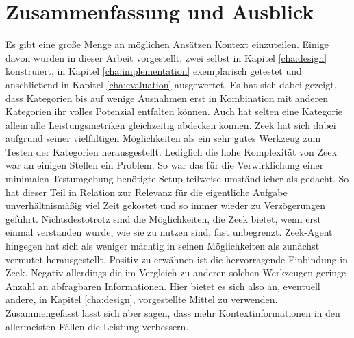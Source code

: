 \chapter{Zusammenfassung und Ausblick}%
\label{cha:conclusion}


Es gibt eine große Menge an möglichen Ansätzen Kontext einzuteilen. Einige davon wurden in dieser Arbeit vorgestellt, zwei selbst in Kapitel \ref{cha:design} konstruiert, in Kapitel \ref{cha:implementation} exemplarisch getestet und anschließend in Kapitel \ref{cha:evaluation} ausgewertet. Es hat sich dabei gezeigt, dass Kategorien bis auf wenige Ausnahmen erst in Kombination mit anderen Kategorien ihr volles Potenzial entfalten können. Auch hat selten eine Kategorie allein alle Leistungsmetriken gleichzeitig abdecken können. Zeek hat sich dabei aufgrund seiner vielfältigen Möglichkeiten als ein sehr gutes Werkzeug zum Testen der Kategorien herausgestellt. Lediglich die hohe Komplexität von Zeek war an einigen Stellen ein Problem. So war das für die Verwirklichung einer minimalen Testumgebung benötigte Setup teilweise umständlicher als gedacht. So hat dieser Teil in Relation zur Relevanz für die eigentliche Aufgabe unverhältnismäßig viel Zeit gekostet und so immer wieder zu Verzögerungen geführt. Nichtsdestotrotz sind die Möglichkeiten, die Zeek bietet, wenn erst einmal verstanden wurde, wie sie zu nutzen sind, fast unbegrenzt. Zeek-Agent hingegen hat sich als weniger mächtig in seinen Möglichkeiten als zunächst vermutet herausgestellt. Positiv zu erwähnen ist die hervorragende Einbindung in Zeek. Negativ allerdings die im Vergleich zu anderen solchen Werkzeugen geringe Anzahl an abfragbaren Informationen. Hier bietet es sich also an, eventuell andere, in Kapitel \ref{cha:design}, vorgestellte Mittel zu verwenden. Zusammengefasst lässt sich aber sagen, dass mehr Kontextinformationen in den allermeisten Fällen die Leistung verbessern.\newline
\subsection{} 
